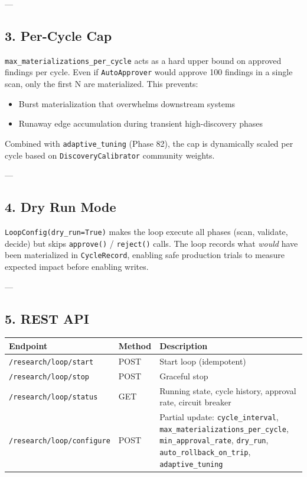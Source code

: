 ---

\subsection{3. Per-Cycle Cap}

\texttt{max\_materializations\_per\_cycle} acts as a hard upper bound on approved findings per cycle. Even if \texttt{AutoApprover} would approve 100 findings in a single scan, only the first N are mater\-ialized. This prevents:
\begin{itemize}
\item Burst mater\-ialization that overwhelms downstream systems
\item Runaway edge accum\-ulation during transient high-discovery phases

\end{itemize}
Combined with \texttt{adaptive\_tuning} (Phase 82), the cap is dynamically scaled per cycle based on \texttt{DiscoveryCalibrator} community weights.

---

\subsection{4. Dry Run Mode}

\texttt{LoopConfig(dry\_run=True)} makes the loop execute all phases (scan, validate, decide) but skips \texttt{approve()} / \texttt{reject()} calls. The loop records what \textit{would} have been mater\-ialized in \texttt{CycleRecord}, enabling safe production trials to measure expected impact before enabling writes.

---

\subsection{5. REST API}

\begin{center}
{\footnotesize
\begin{tabularx}{\columnwidth}{|>{\raggedright\arraybackslash}X|>{\raggedright\arraybackslash}X|>{\raggedright\arraybackslash}X|}
\hline
Endpoint & Method & Description \\ \hline
\texttt{/research/loop/start} & POST & Start loop (idempotent) \\ \hline
\texttt{/research/loop/stop} & POST & Graceful stop \\ \hline
\texttt{/research/loop/status} & GET & Running state, cycle history, approval rate, circuit breaker \\ \hline
\texttt{/research/loop/configure} & POST & Partial update: \texttt{cycle\_interval}, \texttt{max\_materializations\_per\_cycle}, \texttt{min\_approval\_rate}, \texttt{dry\_run}, \texttt{auto\_rollback\_on\_trip}, \texttt{adaptive\_tuning} \\ \hline
\end{tabularx}
}
\end{center}

